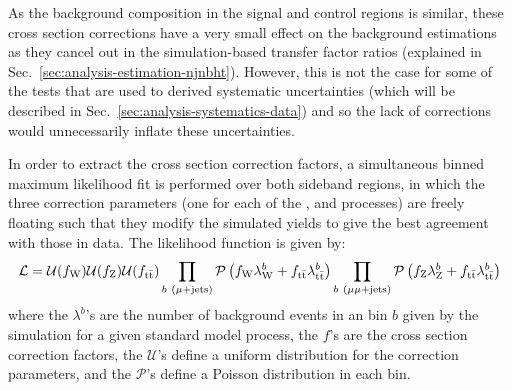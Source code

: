 

As the background composition in the signal and control regions is similar, 
these cross section corrections have a very small effect on the background 
estimations as they cancel out in the simulation-based transfer factor ratios 
(explained in 
Sec.~\ref{sec:analysis-estimation-njnbht}). However, this is not the case for 
some of the tests that are used to derived systematic uncertainties (which will 
be described in Sec.~\ref{sec:analysis-systematics-data}) and so the lack of 
corrections would unnecessarily inflate these uncertainties.


In order to extract the cross section correction factors, a simultaneous binned 
maximum likelihood fit is performed over both \mht sideband regions, in which 
the three correction parameters (one for each of the \zj, \wj and \ttbar 
processes) are freely floating such that they modify the simulated yields to 
give the best agreement with those in data. The likelihood function is given by:
\begin{equation}
\mathcal{L} = \mathcal{U}(f_{\mathrm W}) \mathcal{U}(f_{\mathrm Z}) 
\mathcal{U}(f_{\mathrm{t\bar{t}}}) 
\prod_{b~(\mu+\mathrm{jets})} 
\mathcal{P}\left(f_{\mathrm W} \lambda_{\mathrm W}^b + 
f_{\mathrm{t\bar{t}}} \lambda_{\mathrm{t\bar{t}}}^b\right) \prod_{b~(\mu\mu+\mathrm{jets})} 
\mathcal{P}\left(f_{\mathrm 
Z} \lambda_{\mathrm Z}^b + f_{\mathrm{t\bar{t}}} \lambda_{\mathrm{t\bar{t}}}^b\right)
\end{equation}
where the $\lambda^b$'s are the number of background events in an \njnbht bin 
$b$ given by the simulation for a given standard model process, the $f$'s are 
the cross section correction factors, the $\mathcal{U}$'s define a uniform 
distribution for the correction parameters, and the $\mathcal{P}$'s define a 
Poisson distribution in each bin. 

